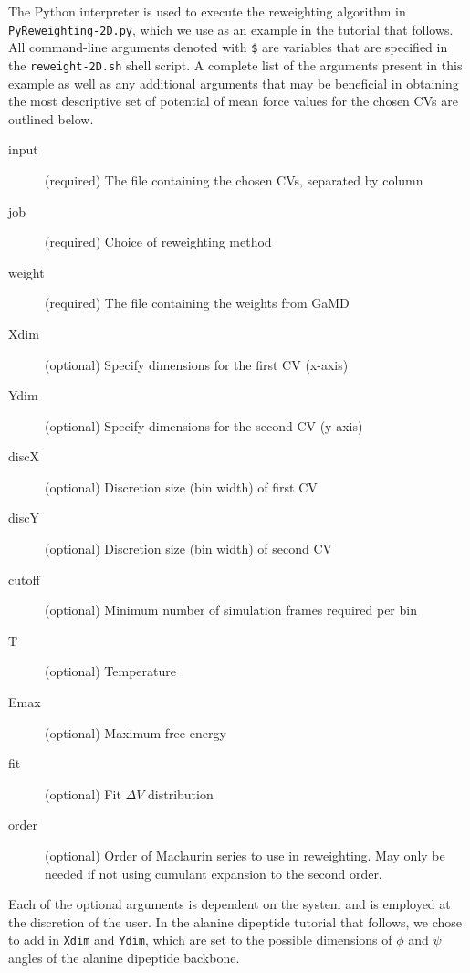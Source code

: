 \documentclass[9pt,tutorial]{livecoms}
\begin{document}
The Python interpreter is used to execute the reweighting algorithm in \texttt{PyReweighting-2D.py}, which we use as an example in the tutorial that follows. All command-line arguments denoted with \texttt{\$} are variables that are specified in the \texttt{reweight-2D.sh} shell script. A complete list of the arguments present in this example as well as any additional arguments that may be beneficial in obtaining the most descriptive set of potential of mean force values for the chosen CVs are outlined below.

\begin{description}
    \item[input] (required) The file containing the chosen CVs, separated by column
    \item[job] (required) Choice of reweighting method
    \item[weight] (required) The file containing the weights from GaMD
    \item[Xdim] (optional) Specify dimensions for the first CV (x-axis)
    \item[Ydim] (optional) Specify dimensions for the second CV (y-axis)
    \item[discX] (optional) Discretion size (bin width) of first CV
    \item[discY] (optional) Discretion size (bin width) of second CV
    \item[cutoff] (optional) Minimum number of simulation frames required per bin
    \item[T] (optional) Temperature
    \item[Emax] (optional) Maximum free energy
    \item[fit] (optional) Fit $\Delta{V}$ distribution
    \item[order] (optional) Order of Maclaurin series to use in reweighting. May only be needed if not using cumulant expansion to the second order.
\end{description}

Each of the optional arguments is dependent on the system and is employed at the discretion of the user. In the alanine dipeptide tutorial that follows, we chose to add in \texttt{Xdim} and \texttt{Ydim}, which are set to the possible dimensions of $\phi$ and $\psi$ angles of the alanine dipeptide backbone.
\end{document}
